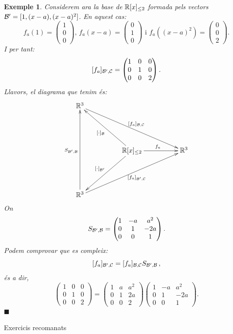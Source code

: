 \documentclass[
  11pt,
]{book}
\makeatletter
\numberwithin{dummy}{section}
\theoremstyle{maincolornumbox}
\theoremstyle{blacknumex}
\newtheorem{exampleT}{Exemple}[chapter]
\theoremstyle{blacknumbox}
\theoremstyle{maincolornum}
\newenvironment{example}{\begin{exampleT}}{\hfill{\tiny\ensuremath{\blacksquare}}\end{exampleT}}
\renewcommand{\section}{\@startsection{section}{1}{\z@}
{-4ex \@plus -1ex \@minus -.4ex}
{1ex \@plus.2ex }
{\normalfont\large\sffamily\bfseries}}
\makeatother
\begin{document}
\begin{example}
Considerem ara la base de \(\mathbb{R}[x]_{\leq2}\) formada pels vectors
\(\mathcal{B}'=[1,(x-a),(x-a)^2]\). En aquest cas:
\[f_a(1)=\begin{pmatrix} 1 \\ 0 \\ 0 \end{pmatrix}
\text{, }
f_a(x-a)=\begin{pmatrix} 0 \\ 1 \\ 0 \end{pmatrix}
\text{ i }
f_a((x-a)^2)=\begin{pmatrix} 0 \\ 0 \\ 2 \end{pmatrix}.\] I per tant:
\[[f_a]_{\mathcal{B}',\mathcal{C}}=\begin{pmatrix} 1 & 0 & 0 \\ 0 & 1 & 0 \\ 0 & 0 & 2\end{pmatrix}.\]
Llavors, el diagrama que tenim és: \[\xymatrix@C50pt@R50pt{
\R^3 \ar[rrd]^{[f_a]_{\calb,\calc}} &  & \\
 & \R[x]_{\leq2} \ar[ul]^{[\cdot]_\calb} \ar[r]^{f_a} \ar[dl]_{[\cdot]_{\calb'}} & \R^3 \\
\R^3 \ar[rru]_{[f_a]_{\calb',\calc}} \ar[uu]^{S_{\calb',\calb}} & &
}\] On
\[S_{\mathcal{B}',\mathcal{B}}=\begin{pmatrix} 1 & -a & a^2 \\ 0 & 1 & -2a \\ 0 & 0 & 1\end{pmatrix}.\]
Podem comprovar que es compleix:
\[[f_a]_{\mathcal{B}',\mathcal{C}}=[f_a]_{\mathcal{B},\mathcal{C}} S_{\mathcal{B}',\mathcal{B}} \,,\] és a
dir,
\[\begin{pmatrix} 1 & 0 & 0 \\ 0 & 1 & 0 \\ 0 & 0 & 2\end{pmatrix} = \begin{pmatrix} 1 & a & a^2 \\ 0 & 1 & 2a \\ 0 & 0 & 2\end{pmatrix} \begin{pmatrix} 1 & -a & a^2 \\ 0 & 1 & -2a \\ 0 & 0 & 1\end{pmatrix}.\]
\end{example}

\hypertarget{exercicis-recomanats-1}{%
\section{Exercicis recomanats}\label{exercicis-recomanats-1}}
\end{document}
